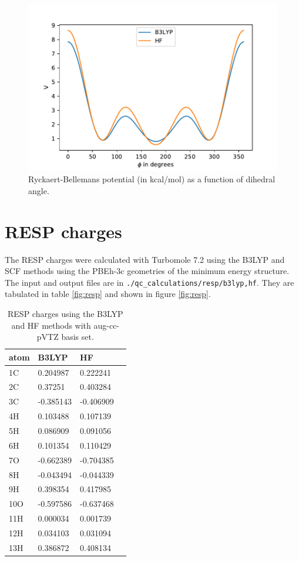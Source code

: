 \documentclass[10pt]{article}
\begin{document}
\begin{figure}[th!]
\centering
\includegraphics[width=0.7\linewidth]{fig/v_rb}
\caption{Ryckaert-Bellemans potential (in kcal/mol) as a function of dihedral angle.}
\label{fig:v_rb}
\end{figure}



\newpage


\section{RESP charges}

The RESP charges were calculated with Turbomole 7.2 using the B3LYP and SCF methods using the PBEh-3c geometries of the minimum energy structure. The input and output files are in \texttt{./qc\_calculations/resp/{b3lyp,hf}}. They are tabulated in table \ref{fig:resp} and shown in figure \ref{fig:resp}.

\begin{table}[ht!]
	\centering
	\label{resp}
	\begin{tabular}{llll} \hline
		atom & B3LYP & HF        &           \\ \hline
		1C &    0.204987  & 0.222241  \\
		2C &    0.37251   & 0.403284  \\
		3C &    -0.385143 & -0.406909 \\
		4H &    0.103488  & 0.107139  \\
		5H &    0.086909  & 0.091056  \\
		6H &    0.101354  & 0.110429  \\
		7O &    -0.662389 & -0.704385 \\
		8H &    -0.043494 & -0.044339 \\
		9H &    0.398354  & 0.417985  \\
		10O &   -0.597586 & -0.637468 \\
		11H &   0.000034  & 0.001739  \\
		12H &   0.034103  & 0.031094  \\
		13H &   0.386872  & 0.408134 \\ \hline
	\end{tabular}
	\caption{RESP charges using the B3LYP and HF methods with aug-cc-pVTZ basis set.}
\end{table}
\end{document}
